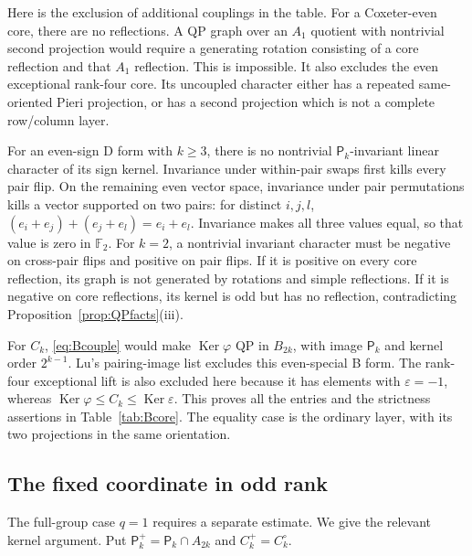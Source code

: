 \documentclass[11pt]{article}
\numberwithin{equation}{section}
\theoremstyle{definition}
\DeclareMathOperator{\Ker}{Ker}
\newcommand{\F}{\mathbb F}
\newcommand{\ee}{\varepsilon}
\newcommand{\pair}{\mathsf P}
\begin{document}
Here is the exclusion of additional couplings in the table.
For a Coxeter-even core, there are no reflections.
A QP graph over an \(A_1\) quotient with nontrivial second projection would require a generating rotation consisting of a core reflection and that \(A_1\) reflection.
This is impossible.
It also excludes the even exceptional rank-four core.
Its uncoupled character either has a repeated same-oriented Pieri projection, or has a second projection which is not a complete row/column layer.

For an even-sign D form with \(k\geq3\), there is no nontrivial \(\pair_k\)-invariant linear character of its sign kernel.
Invariance under within-pair swaps first kills every pair flip.
On the remaining even vector space, invariance under pair permutations kills a vector supported on two pairs: for distinct \(i,j,l\),
\((e_i+e_j)+(e_j+e_l)=e_i+e_l\).
Invariance makes all three values equal, so that value is zero in \(\F_2\).
For \(k=2\), a nontrivial invariant character must be negative on cross-pair flips and positive on pair flips.
If it is positive on every core reflection, its graph is not generated by rotations and simple reflections.
If it is negative on core reflections, its kernel is odd but has no reflection, contradicting Proposition~\ref{prop:QPfacts}(iii).

For \(C_k\), \eqref{eq:Bcouple} would make \(\Ker\varphi\) QP in \(B_{2k}\), with image \(\pair_k\) and kernel order \(2^{k-1}\).
Lu's pairing-image list excludes this even-special B form.
The rank-four exceptional lift is also excluded here because it has elements with \(\ee=-1\), whereas \(\Ker\varphi\leq C_k\leq\Ker\ee\).
This proves all the entries and the strictness assertions in Table~\ref{tab:Bcore}.
The equality case is the ordinary layer, with its two projections in the same orientation.

\subsection{The fixed coordinate in odd rank}

The full-group case \(q=1\) requires a separate estimate.
We give the relevant kernel argument.
Put \(\pair_k^+=\pair_k\cap A_{2k}\) and \(C_k^+=C_k^\circ\).
\end{document}
